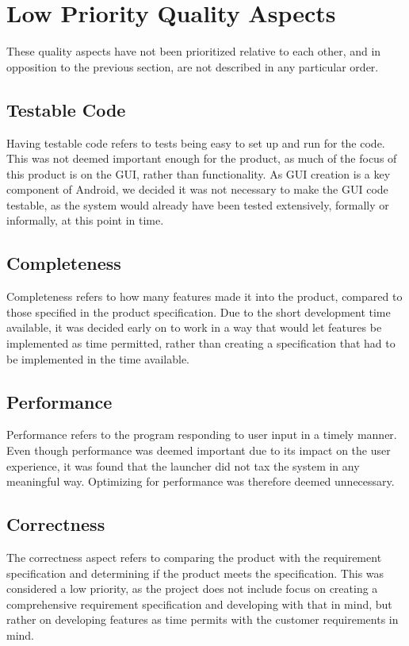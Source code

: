 \section{Low Priority Quality Aspects}
These quality aspects have not been prioritized relative to each other, and in opposition to the previous section, are not described in any particular order. 

\subsection*{Testable Code}
Having testable code refers to tests being easy to set up and run for the code. 
This was not deemed important enough for the product, as much of the focus of this product is on the GUI, rather than functionality. 
As GUI creation is a key component of Android, we decided it was not necessary to make the GUI code testable, as the system would already have been tested extensively, formally or informally, at this point in time. 

\subsection*{Completeness}
Completeness refers to how many features made it into the product, compared to those specified in the product specification. 
Due to the short development time available, it was decided early on to work in a way that would let features be implemented as time permitted, rather than creating a specification that had to be implemented in the time available.

\subsection*{Performance}
Performance refers to the program responding to user input in a timely manner. 
Even though performance was deemed important due to its impact on the user experience, it was found that the launcher did not tax the system in any meaningful way.
Optimizing for performance was therefore deemed unnecessary.

\subsection*{Correctness}
The correctness aspect refers to comparing the product with the requirement specification and determining if the product meets the specification. 
This was considered a low priority, as the project does not include focus on creating a comprehensive requirement specification and developing with that in mind, but rather on developing features as time permits with the customer requirements in mind.

